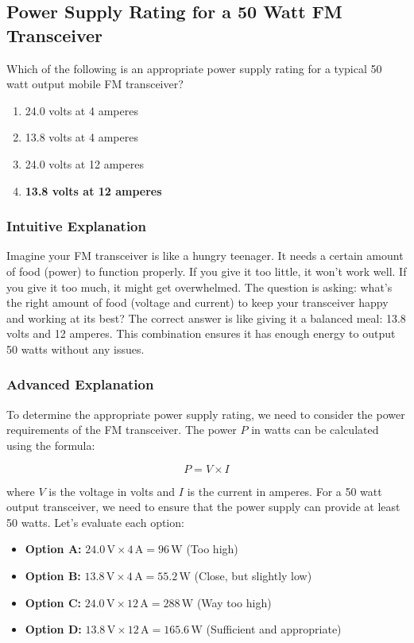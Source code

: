 \subsection{Power Supply Rating for a 50 Watt FM Transceiver}
\label{T4A01}

\begin{tcolorbox}[colback=gray!10!white,colframe=black!75!black,title=T4A01]
Which of the following is an appropriate power supply rating for a typical 50 watt output mobile FM transceiver?
\begin{enumerate}[label=\Alph*)]
    \item 24.0 volts at 4 amperes
    \item 13.8 volts at 4 amperes
    \item 24.0 volts at 12 amperes
    \item \textbf{13.8 volts at 12 amperes}
\end{enumerate}
\end{tcolorbox}

\subsubsection{Intuitive Explanation}
Imagine your FM transceiver is like a hungry teenager. It needs a certain amount of food (power) to function properly. If you give it too little, it won't work well. If you give it too much, it might get overwhelmed. The question is asking: what's the right amount of food (voltage and current) to keep your transceiver happy and working at its best? The correct answer is like giving it a balanced meal: 13.8 volts and 12 amperes. This combination ensures it has enough energy to output 50 watts without any issues.

\subsubsection{Advanced Explanation}
To determine the appropriate power supply rating, we need to consider the power requirements of the FM transceiver. The power \( P \) in watts can be calculated using the formula:

\[
P = V \times I
\]

where \( V \) is the voltage in volts and \( I \) is the current in amperes. For a 50 watt output transceiver, we need to ensure that the power supply can provide at least 50 watts. Let's evaluate each option:

\begin{itemize}
    \item \textbf{Option A:} \( 24.0 \, \text{V} \times 4 \, \text{A} = 96 \, \text{W} \) (Too high)
    \item \textbf{Option B:} \( 13.8 \, \text{V} \times 4 \, \text{A} = 55.2 \, \text{W} \) (Close, but slightly low)
    \item \textbf{Option C:} \( 24.0 \, \text{V} \times 12 \, \text{A} = 288 \, \text{W} \) (Way too high)
    \item \textbf{Option D:} \( 13.8 \, \text{V} \times 12 \, \text{A} = 165.6 \, \text{W} \) (Sufficient and appropriate)
\end{itemize}

